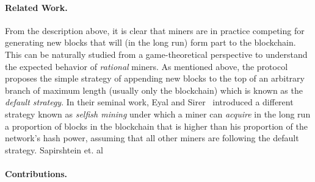 \paragraph*{\bf Related Work.} From the description above, it is clear that miners are in practice competing for generating new blocks that will (in the long run) form part to the blockchain. This can be naturally studied from a game-theoretical perspective to understand the expected behavior of \emph{rational} miners. As mentioned above, the protocol proposes the simple strategy of appending new blocks to the top of an arbitrary branch of maximum length (usually only the blockchain) which is known as the \emph{default strategy}. In their seminal work, Eyal and Sirer~\cite{selfishmining2014} introduced a different strategy known as \emph{selfish mining} under which a miner can \emph{acquire} in the long run a proportion of blocks in the blockchain that is higher than his proportion of the network's hash power, assuming that all other miners are following the default strategy. Sapirshtein et. al \cite{optimalselfishmining2017}

\paragraph*{\bf Contributions.} 



